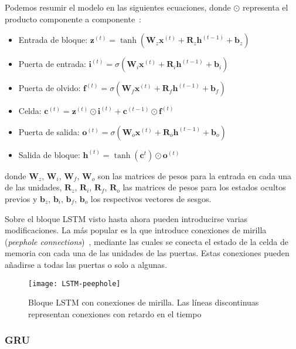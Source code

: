 Podemos resumir el modelo en las siguientes ecuaciones, donde $\odot$ representa el producto componente a componente~\cite{greff2016lstm}:

\begin{itemize}
\item Entrada de bloque: $\textbf{z}^{(t)} = \tanh(\textbf{W}_z \textbf{x}^{(t)} +  \textbf{R}_z \textbf{h}^{(t-1)}  + \textbf{b}_z)$
\item Puerta de entrada: $\textbf{i}^{(t)} = \sigma(\textbf{W}_i\textbf{x}^{(t)} + \textbf{R}_i \textbf{h}^{(t-1)} + \textbf{b}_i)$
\item Puerta de olvido: $\textbf{f}^{(t)} = \sigma(\textbf{W}_f \textbf{x}^{(t)} + \textbf{R}_f\textbf{h}^{(t-1)} + \textbf{b}_f)$
\item Celda: $\textbf{c}^{(t)} = \textbf{z}^{(t)}\odot \textbf{i}^{(t)} + \textbf{c}^{(t-1)} \odot \textbf{f}^{(t)}$
\item Puerta de salida: $\textbf{o}^{(t)} = \sigma(\textbf{W}_o \textbf{x}^{(t)} + \textbf{R}_o \textbf{h}^{(t-1)} + \textbf{b}_o)$
\item Salida de bloque: $\textbf{h}^{(t)} = \tanh (\textbf{c}^t) \odot \textbf{o}^{(t)}$
\end{itemize}

donde $\textbf{W}_z$, $\textbf{W}_i$, $\textbf{W}_f$, $\textbf{W}_o$ son las matrices de pesos para la entrada en cada una de las unidades, $\textbf{R}_z$, $\textbf{R}_i$, $\textbf{R}_f$, $\textbf{R}_o$ las matrices de pesos para los estados ocultos previos y $\textbf{b}_z$, $\textbf{b}_i$, $\textbf{b}_f$, $\textbf{b}_o$ los respectivos vectores de sesgos.

Sobre el bloque LSTM visto hasta ahora pueden introducirse varias modificaciones. La más popular es la que introduce conexiones de mirilla (\textit{peephole connections})~\cite{gers2000recurrent}, mediante las cuales se conecta el estado de la celda de memoria con cada una de las unidades de las puertas. Estas conexiones pueden añadirse a todas las puertas o solo a algunas.

\begin{figure}[htpb]
  \centering
  \texttt{[image: LSTM-peephole]}
  \caption{Bloque LSTM con conexiones de mirilla. Las líneas discontinuas representan conexiones con retardo en el tiempo}
  \label{fig:LSTM-peephole}
\end{figure}

\subsubsection{GRU}

